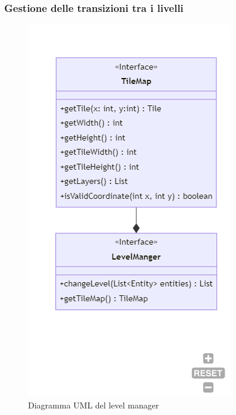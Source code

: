 \documentclass[a4paper,12pt]{report}
\begin{document}
\subsubsection*{Gestione delle transizioni tra i livelli}
\begin{figure}[h]
	\centering
	\includegraphics[width=\textwidth]{uml/LevelManager.png}
	\caption{Diagramma UML del level manager}
\end{figure}
\end{document}
